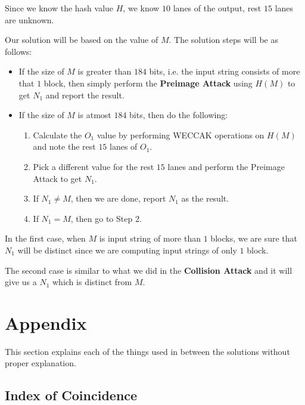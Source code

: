 \documentclass[10pt,twoside]{article}
\newcommand\bold\textbf
\begin{document}
\begin{solution}
  Since we know the hash value $H$, we know $10$ lanes of the output, rest $15$ lanes are unknown. \newline

  Our solution will be based on the value of $M$. \newline
  The solution steps will be as follows:
  \begin{itemize}
    \setlength\itemsep{0em}
    \item If the size of $M$ is greater than $184$ bits, i.e. the input string consists of more that $1$ block, then simply perform the \bold{Preimage Attack} using $H(M)$ to get $N_1$ and report the result.
    \item If the size of $M$ is atmost $184$ bits, then do the following:
      \begin{enumerate}
        \setlength\itemsep{0em}
        \item Calculate the $O_1$ value by performing WECCAK operations on $H(M)$ and note the rest $15$ lanes of $O_1$.
        \item Pick a different value for the rest $15$ lanes and perform the Preimage Attack to get $N_1$.
        \item If $N_1 \neq M$, then we are done, report $N_1$ as the result.
        \item If $N_1 = M$, then go to Step 2.
      \end{enumerate}
  \end{itemize}

  In the first case, when $M$ is input string of more than $1$ blocks, we are sure that $N_1$ will be distinct since we are computing input strings of only $1$ block. \newline

  The second case is similar to what we did in the \bold{Collision Attack} and it will give us a $N_1$ which is distinct from $M$.
\end{solution}

\newpage
\section{Appendix}

This section explains each of the things used in between the solutions without proper explanation.

\subsection{Index of Coincidence} \label{ic}
\end{document}
